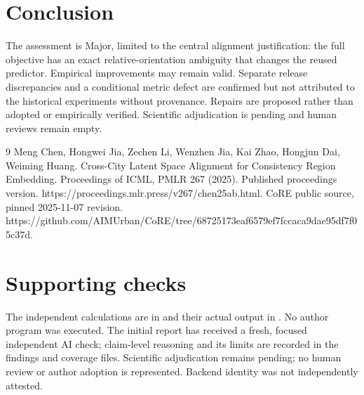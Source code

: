 \documentclass[10pt]{article}
\begin{document}
\section*{Conclusion}
The assessment is Major, limited to the central alignment justification: the full objective has an exact relative-orientation ambiguity that changes the reused predictor. Empirical improvements may remain valid. Separate release discrepancies and a conditional metric defect are confirmed but not attributed to the historical experiments without provenance. Repairs are proposed rather than adopted or empirically verified. Scientific adjudication is pending and human reviews remain empty.\par
9 Meng Chen, Hongwei Jia, Zechen Li, Wenzhen Jia, Kai Zhao, Hongjun Dai, Weiming Huang. Cross-City Latent Space Alignment for Consistency Region Embedding. Proceedings of ICML, PMLR 267 (2025). Published proceedings version. https://proceedings.mlr.press/v267/chen25ab.html. CoRE public source, pinned 2025-11-07 revision. https://github.com/AIMUrban/CoRE/tree/68725173eaf6579ef7fccaca9dae95df7f05c37d.\par
\section*{Supporting checks}
The independent calculations are in and their actual output in . No author program was executed. The initial report has received a fresh, focused independent AI check; claim-level reasoning and its limits are recorded in the findings and coverage files. Scientific adjudication remains pending; no human review or author adoption is represented. Backend identity was not independently attested.\par
\end{document}
